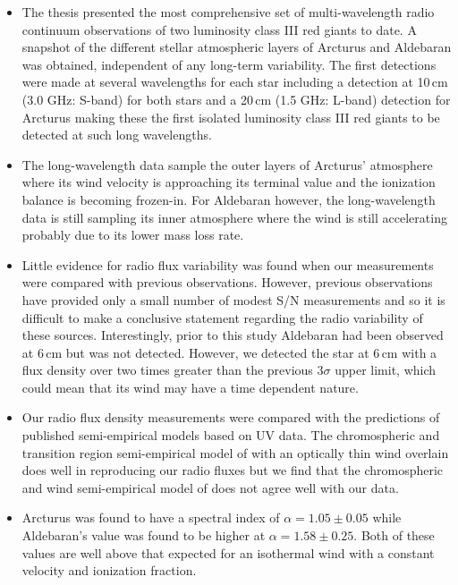 \begin{itemize}
	\item The thesis presented the most comprehensive set of multi-wavelength radio continuum observations of two luminosity class III red giants to date. A snapshot of the different stellar atmospheric layers of Arcturus and Aldebaran was obtained, independent of any long-term variability. The first detections were made at several wavelengths for each star including a detection at 10\,cm (3.0 GHz: S-band) for both stars and a 20\,cm (1.5 GHz: L-band) detection for Arcturus making these the first isolated luminosity class III red giants to be detected at such long wavelengths.
  
	\item The long-wavelength data sample the outer layers of Arcturus' atmosphere where its wind velocity is approaching its terminal value and the ionization balance is becoming frozen-in. For Aldebaran however, the long-wavelength data is still sampling its inner atmosphere where the wind is still accelerating probably due to its lower mass loss rate. 

	\item Little evidence for radio flux variability was found when our measurements were compared with previous observations. However, previous observations have provided only a small number of modest S/N measurements and so it is difficult to make a conclusive statement regarding the radio variability of these sources. Interestingly, prior to this study Aldebaran had been observed at 6\,cm but was not detected. However, we detected the star at 6\,cm with a flux density over two times greater than the previous $3\sigma$ upper limit, which could mean that its wind may have a time dependent nature.
	  
	\item Our radio flux density measurements were compared with the predictions of published semi-empirical models based on UV data. The chromospheric and transition region semi-empirical model of \cite{mcmurry_1999} with an optically thin wind overlain does well in reproducing our radio fluxes but we find that the chromospheric and wind semi-empirical model of \cite{drake_1985} does not agree well with our data.
  
	\item Arcturus was found to have a spectral index of $\alpha = 1.05 \pm 0.05$ while Aldebaran's value was found to be higher at $\alpha = 1.58 \pm 0.25$. Both of these values are well above that expected for an isothermal wind with a constant velocity and ionization fraction.


\end{itemize}
